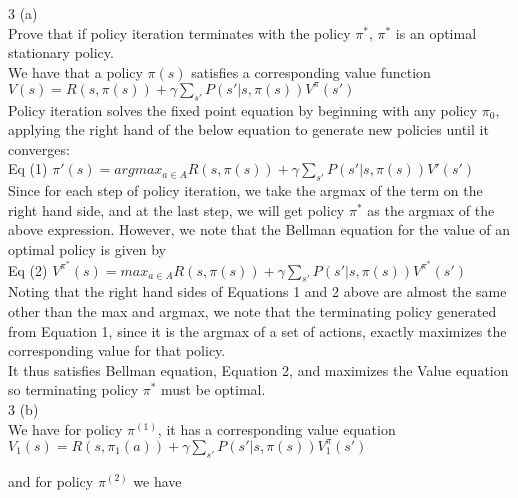 \documentclass[12pt]{scrartcl}
\begin{document}
3 (a) \\

Prove that if policy iteration terminates with the policy $\pi^*$, $\pi^*$ is an optimal stationary policy. \\

We have that a policy $\pi(s)$ satisfies a corresponding value function \\ $\displaystyle{V(s) = R(s, \pi(s)) + \gamma \sum_{s'}{P(s' | s, \pi(s))V^{\pi}(s')}}$ \\

Policy iteration solves the fixed point equation by beginning with any policy $\pi_0$, applying the right hand of the below equation to generate new policies until it converges: \\

Eq (1) $\displaystyle{\pi '(s) = argmax_{a \in A} R(s, \pi(s)) + \gamma \sum_{s'}{P(s' | s, \pi(s))V'(s')}}$ \\

Since for each step of policy iteration, we take the argmax of the term on the right hand side, and at the last step, we will get policy $\pi^*$ as the argmax of the above expression. However, we note that the Bellman equation for the value of an optimal policy is given by \\

Eq (2) $\displaystyle{V^{\pi^*}(s) = max_{a \in A} R(s, \pi(s)) + \gamma \sum_{s'}{P(s' | s, \pi(s))V^{\pi^*}(s')}}$ \\

Noting that the right hand sides of Equations 1 and 2 above are almost the same other than the max and argmax, we note that the terminating policy generated from Equation 1, since it is the argmax of a set of actions, exactly maximizes the corresponding value for that policy. \\

It thus satisfies Bellman equation, Equation 2, and maximizes the Value equation so terminating policy $\pi^*$ must be optimal. \\

3 (b) \\

We have for policy $\pi^{(1)}$, it has a corresponding value equation \\

$\displaystyle{V_1(s) = R(s, \pi_1(a)) +  \gamma \sum_{s'}{P(s' | s, \pi(s))V_1^{\pi}(s')}}$ 

and for policy $\pi^{(2)}$ we have \\
\end{document}

